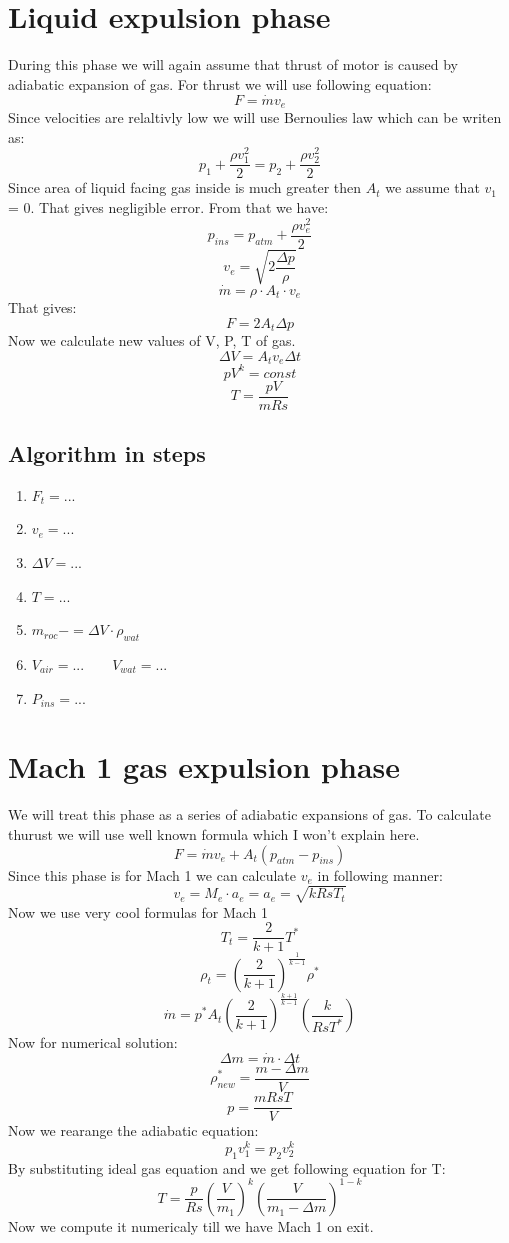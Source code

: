\documentclass{report}
\begin{document}
\section{Liquid expulsion phase}
During this phase we will again assume that thrust of motor is caused by adiabatic expansion of gas. For thrust we will use following equation:
$$F = \dot{m} v_e$$
Since velocities are relaltivly low we will use Bernoulies law which can be writen as:
$$ p_1 + \frac{\rho v_1^2}{2} = p_2 + \frac{\rho v_2^2}{2} $$
Since area of liquid facing gas inside is much greater then $A_t$ we assume that $v_1$ = 0. That gives negligible error.  From that we have:
$$ p_{ins} = p_{atm} + \frac{\rho v_e^2}{2} $$
$$v_e = \sqrt{2\frac{\Delta p}{\rho}}$$
$$\dot{m} = \rho\cdot A_t\cdot v_e$$
That gives:
$$ F = 2 A_t \Delta p$$
Now we calculate new values of V, P, T of gas.
$$\Delta V = A_t v_e \Delta t$$
$$pV^k = const$$
$$ T = \frac{p V}{m Rs}$$

\subsection*{Algorithm in steps}
\begin{enumerate}
\item $F_t = ...$
\item $v_e = ...$
\item $\Delta V =...$
\item $T = ...$
\item $m_{roc} -= \Delta V \cdot \rho_{wat}$
\item $ V_{air} = ... \qquad V_{wat} = ...$
\item $P_{ins} = ...$
\end{enumerate}


\section{Mach 1 gas expulsion phase}
We will treat this phase as a series of adiabatic expansions of gas. To calculate thurust we will use well known formula which I won't explain here.
$$F = \dot{m}v_e + A_t(p_{atm} - p_{ins})$$
Since this phase is for Mach 1 we can calculate $v_e$ in following manner:
$$v_e = M_e\cdot a_e = a_e = \sqrt{kRsT_t}$$
Now we use very cool formulas for Mach 1
$$T_t = \frac{2}{k+1}T^*$$
$$\rho_t = \left(\frac{2}{k+1}\right)^{\frac{1}{k-1}}\rho^*$$
$$\dot{m} = p^* A_t\left(\frac{2}{k+1}\right)^{\frac{k+1}{k-1}}\left(\frac{k}{RsT^*}\right)$$
Now for numerical solution:
$$\Delta m = \dot{m} \cdot \Delta t$$
$$\rho^*_{new} = \frac{m-\Delta m}{V}$$
$$p = \frac{mRsT}{V}$$
Now we rearange the adiabatic equation:
$$p_1v_1^k = p_2v_2^k$$ 
By substituting ideal gas equation and we get following equation for T:
$$T = \frac{p}{Rs}\left(\frac{V}{m_1}\right)^k\left(\frac{V}{m_1 - \Delta m}\right)^{1-k}$$
Now we compute it numericaly till we have Mach 1 on exit.\\\\
\end{document}
